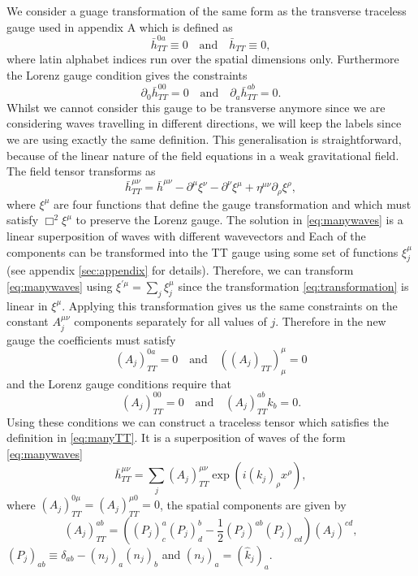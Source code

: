 We consider a guage transformation of the same form as the transverse
traceless gauge used in appendix A which is defined as
\begin{equation}\label{eq:manyTT}
\bar{h}^{0a}_{TT} \equiv 0 \,\,\,\,\,\, \text{and} \,\,\,\,\,\, \bar{h}_{TT} \equiv 0,
\end{equation}
where latin alphabet indices run over the spatial dimensions
only. Furthermore the Lorenz gauge condition gives the constraints
\begin{equation}
\partial_0\bar{h}^{00}_{TT} = 0 \,\,\,\,\,\, \text{and} \,\,\,\,\,\, \partial_a\bar{h}^{ab}_{TT} = 0.
\end{equation}
Whilst we cannot consider this gauge to be transverse anymore since we
are considering waves travelling in different directions, we will keep
the labels since we are using exactly the same definition. This
generalisation is straightforward, because of the linear nature of the
field equations in a weak gravitational field. The field tensor
transforms as 
\begin{equation}\label{eq:transformation}
\bar{h}^{\mu\nu}_{TT} = \bar{h}^{\mu\nu} - \partial^{\mu}\xi^{\nu} -
\partial^{\nu}\xi^{\mu} + \eta^{\mu\nu}\partial_\rho\xi^\rho,
\end{equation}
where $\xi^\mu$ are four functions that define the gauge
transformation and which must satisfy $\Box^2\xi^\mu$ to preserve the
Lorenz gauge. The solution in \eqref{eq:manywaves} is a linear
superposition of waves with different wavevectors and Each of the
components can be transformed into the TT gauge using some set of
functions $\xi^\mu_j$ (see appendix \ref{sec:appendix} for
details). Therefore, we can transform \eqref{eq:manywaves} using
$\xi^{\prime\mu} = \sum_j \xi^\mu_j$ since the transformation
\eqref{eq:transformation} is linear in $\xi^\mu$. Applying this
transformation gives us the same constraints on the constant
$A_j^{\mu\nu}$ components separately for all values of $j$. Therefore
in the new gauge the coefficients must satisfy
\begin{equation}
(A_j)^{0a}_{TT} = 0 \,\,\,\,\,\, \text{and} \,\,\,\,\,\, ((A_j)_{TT})^\mu_\mu = 0
\end{equation}
and the Lorenz gauge conditions require that
\begin{equation}
(A_j)^{00}_{TT} = 0 \,\,\,\,\,\, \text{and} \,\,\,\,\,\, (A_j)^{ab}_{TT}k_b = 0.
\end{equation}
Using these conditions we can construct a traceless tensor which
satisfies the definition in \eqref{eq:manyTT}. It is a superposition
of waves of the form \eqref{eq:manywaves}
\begin{equation}\label{eq:manyh}
\bar{h}^{\mu\nu}_{TT} = \sum_j(A_j)_{TT}^{\mu\nu}\exp(i(k_j)_\rho x^\rho),
\end{equation}
where $(A_j)_{TT}^{0\mu} = (A_j)_{TT}^{\mu 0} = 0$, the spatial
components are given by
\begin{equation}
(A_j)^{ab}_{TT} = ((P_j)^a_c(P_j)^b_d - \frac{1}{2}(P_j)^{ab}(P_j)_{cd})(A_j)^{cd},
\end{equation}
$(P_j)_{ab} \equiv \delta_{ab} - (n_j)_a(n_j)_b$ and $(n_j)_a =
(\hat{k}_j)_a$.

